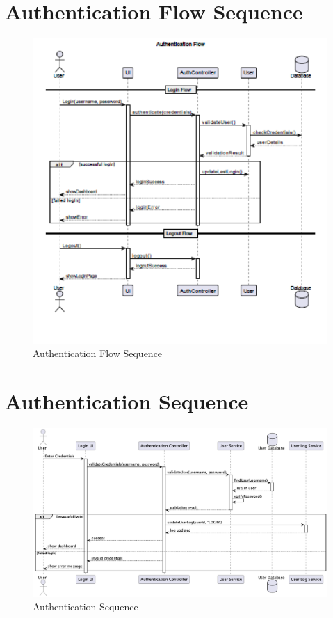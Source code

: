 \documentclass[12pt,a4paper]{report}
\begin{document}
\section{Authentication Flow Sequence}
\begin{figure}[htbp]
    \centering
    \includegraphics[width=1\textwidth]{authentication-flow-sequence.png}
    \caption{Authentication Flow Sequence}
    \label{fig:authentication-flow-sequence}
\end{figure}

\section{Authentication Sequence}
\begin{figure}[htbp]
    \centering
    \includegraphics[width=1\textwidth]{authentication-sequence.png}
    \caption{Authentication Sequence}
    \label{fig:authentication-sequence}
\end{figure}
\end{document}
